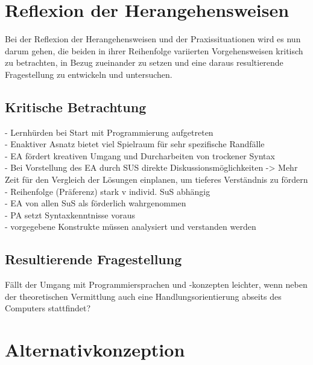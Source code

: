 \documentclass[paper=a4, DIV=13, BCOR=12mm, twoside=on, onecolumn=on, open = any, titlepage =on, parskip =half-, headsepline = on, footsepline = on, chapterprefix = on, sectionprefix = on, appendixprefix = off, fontsize = 11pt, numbers = noenddot, abstract = off]{scrreprt}
\begin{document}
\par \singlespacing
\chapter{Reflexion der Herangehensweisen}
\onehalfspacing
 Bei der Reflexion der Herangehensweisen und der Praxissituationen wird es nun darum gehen, die beiden in ihrer Reihenfolge variierten Vorgehensweisen kritisch zu betrachten, in Bezug zueinander zu setzen und eine daraus resultierende Fragestellung zu entwickeln und untersuchen.

\par \singlespacing
\section{Kritische Betrachtung}
\onehalfspacing

- Lernhürden bei Start mit Programmierung aufgetreten\\
- Enaktiver Asnatz bietet viel Spielraum für sehr spezifische Randfälle\\
- EA fördert kreativen Umgang und Durcharbeiten von trockener Syntax\\
- Bei Vorstellung des EA durch SUS direkte Diskussionsmöglichkeiten -> Mehr Zeit für den Vergleich der Lösungen einplanen, um tieferes Verständnis zu fördern\\
- Reihenfolge (Präferenz) stark v individ. SuS abhängig\\
- EA von allen SuS als förderlich wahrgenommen\\
- PA setzt Syntaxkenntnisse voraus\\
- vorgegebene Konstrukte müssen analysiert und verstanden werden\\


\par \singlespacing
 \section{Resultierende Fragestellung}
\onehalfspacing

Fällt der Umgang mit Programmiersprachen und -konzepten leichter, wenn neben der theoretischen Vermittlung auch eine Handlungsorientierung abseits des Computers stattfindet?

\par \singlespacing
\chapter{Alternativkonzeption}
\onehalfspacing
\end{document}
